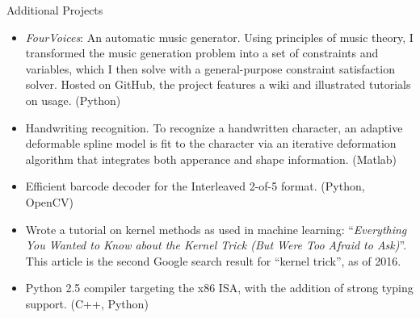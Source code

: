 \documentclass{resume}
\begin{document}
\vspace{-1em}

\begin{component}{Additional Projects}
	\begin{itemize}
		\vspace{-0.5em}\item \emph{FourVoices}: An automatic music generator.
Using principles of music theory, I transformed the music generation problem into a set of constraints and variables, which I then solve with a general-purpose constraint satisfaction solver.
Hosted on GitHub, the project features a wiki and illustrated tutorials on usage.
		(Python)
        \vspace{-0.5em}\item Handwriting recognition.
To recognize a handwritten character, an adaptive deformable spline model is fit to the character via an iterative deformation algorithm that integrates both apperance and shape information.
(Matlab)
        \vspace{-0.5em}\item Efficient barcode decoder
	        for the Interleaved 2-of-5 format. (Python, OpenCV)
        \vspace{-0.5em}\item Wrote a tutorial on kernel methods as used in machine learning: ``\emph{Everything You Wanted to Know about the Kernel Trick (But Were Too Afraid to Ask)}''. This article is the second Google search result for ``kernel trick'', as of 2016.
		\vspace{-0.5em}\item Python 2.5 compiler targeting the x86 ISA, with the addition of
		strong typing support. (C++, Python)
	\end{itemize}
\end{component}
\end{document}
